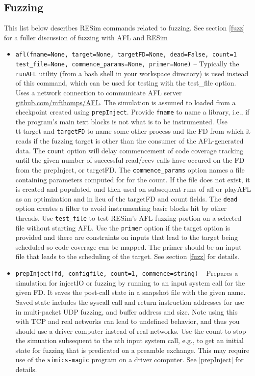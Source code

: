 \documentclass[titlepage]{article}
\begin{document}
\subsection{Fuzzing}
\label{fuzzing}
This list below describes RESim commands related to fuzzing.  See section \ref{fuzz} for a fuller discussion of fuzzing with AFL and RESim
\begin{itemize}

\item{\tt afl(fname=None, target=None, targetFD=None, dead=False, count=1 test\_file=None, commence\_params=None, primer=None)} -- Typically the {\tt runAFL} utility (from a bash shell in your workspace directory) is used instead of this command, which can be used for testing with the test\_file option.  Uses a network connection to communicate AFL server \url{github.com/mfthomps/AFL}.  
The simulation is assumed to loaded from a checkpoint created using {\tt prepInject}.  Provide {\tt fname} to name a library, i.e., if the program's main
text blocks is not what is to be instrumented.
Use {\\tt target} and {\tt targetFD} to name some other process 
and the FD from which it reads if the fuzzing target is other
than the consumer of the AFL-generated data.  The {\tt count} option will delay commencement of code coverage tracking until the given 
number of successful read/recv calls have occured on the FD from the prepInject,  or targetFD.   The {\tt commence\_params} option names a 
file containing parameters computed for for the count.  If the file does not exist, it is created and populated, and then used on subsequent runs of afl or playAFL
as an optimization and in lieu of the targetFD and count fields.
The {\tt dead} option creates a filter to avoid instrumenting basic blocks hit by other threads.
Use {\tt test\_file} to test RESim's AFL fuzzing portion on a selected file without starting AFL.
Use the {\tt primer} option if the target option is provided and there are constraints on inputs that lead to the target being scheduled 
so code coverage can be mapped.  The primer should be an input file that leads to the scheduling of the target.
See section \ref{fuzz} for details.

\item{\tt prepInject(fd, configfile, count=1, commence=string)} -- Prepares a simulation for injectIO or fuzzing by running to an input system call for the given FD.  It saves the post-call state in a snapshot
file with the given name.  Saved state includes the syscall call and return instruction addresses for use in multi-packet UDP fuzzing, and buffer address and size.
Note using this with TCP and real networks can lead to undefined behavior, and thus you should use a driver computer instead of real networks.  
Use the count to stop the simuation subsequent to the nth input system call, e.g., to get an initial state for fuzzing that is predicated on a preamble exchange.
This may require use of the {\tt simics-magic} program on a driver computer.  See \ref{prepInject} for details.


\end{itemize}
\end{document}
